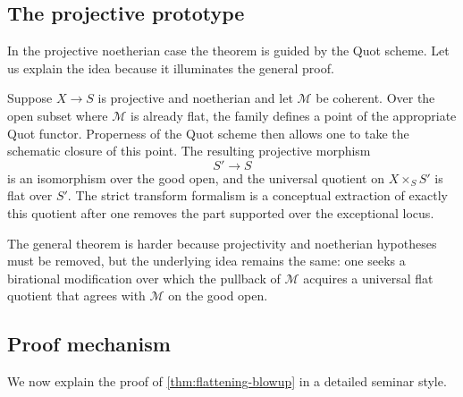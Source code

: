 \documentclass[11pt,oneside]{article}
\newcommand{\M}{\mathcal M}
\begin{document}
\subsection{The projective prototype}

In the projective noetherian case the theorem is guided by the Quot scheme.  Let us explain the idea because it illuminates the general proof.

Suppose $X\to S$ is projective and noetherian and let $\M$ be coherent.  Over the open subset where $\M$ is already flat, the family defines a point of the appropriate Quot functor.  Properness of the Quot scheme then allows one to take the schematic closure of this point.  The resulting projective morphism
\[
S'\to S
\]
is an isomorphism over the good open, and the universal quotient on $X\times_S S'$ is flat over $S'$.  The strict transform formalism is a conceptual extraction of exactly this quotient after one removes the part supported over the exceptional locus.

The general theorem is harder because projectivity and noetherian hypotheses must be removed, but the underlying idea remains the same: one seeks a birational modification over which the pullback of $\M$ acquires a universal flat quotient that agrees with $\M$ on the good open.

\subsection{Proof mechanism}

We now explain the proof of \cref{thm:flattening-blowup} in a detailed seminar style.
\end{document}
